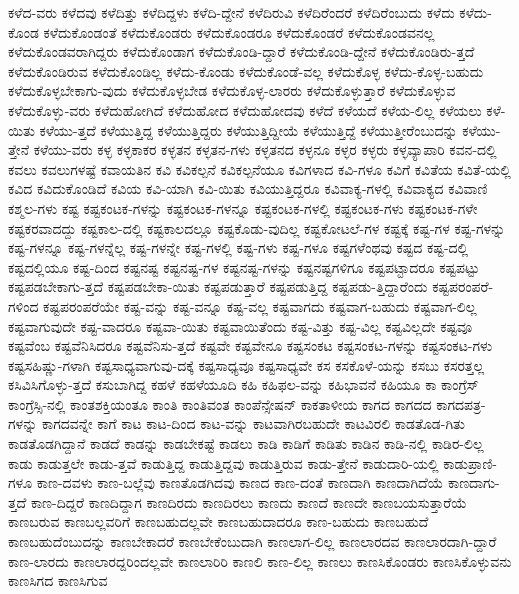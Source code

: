 {ಕಳೆದ-ವರು
ಕಳೆದವು
ಕಳೆದಿತ್ತು
ಕಳೆದಿದ್ದಳು
ಕಳೆದಿ-ದ್ದೇನೆ
ಕಳೆದಿರುವಿ
ಕಳೆದಿರೆಂದರೆ
ಕಳೆದಿರೆಂಬುದು
ಕಳೆದು
ಕಳೆದು-ಕೊಂಡ
ಕಳೆದುಕೊಂಡಂತೆ
ಕಳೆದುಕೊಂಡರು
ಕಳೆದುಕೊಂಡರೂ
ಕಳೆದುಕೊಂಡರೆ
ಕಳೆದುಕೊಂಡವನಲ್ಲ
ಕಳೆದುಕೊಂಡವರಾಗಿದ್ದರು
ಕಳೆದುಕೊಂಡಾಗ
ಕಳೆದುಕೊಂಡಿ-ದ್ದಾರೆ
ಕಳೆದುಕೊಂಡಿ-ದ್ದೇನೆ
ಕಳೆದುಕೊಂಡಿರು-ತ್ತದೆ
ಕಳೆದುಕೊಂಡಿರುವ
ಕಳೆದುಕೊಂಡಿಲ್ಲ
ಕಳೆದು-ಕೊಂಡು
ಕಳೆದುಕೊಂಡೆ-ವಲ್ಲ
ಕಳೆದುಕೊಳ್ಳ
ಕಳೆದು-ಕೊಳ್ಳ-ಬಹುದು
ಕಳೆದುಕೊಳ್ಳಬೇಕಾಗು-ವುದು
ಕಳೆದುಕೊಳ್ಳಬೇಡ
ಕಳೆದುಕೊಳ್ಳ-ಲಾರರು
ಕಳೆದುಕೊಳ್ಳುತ್ತಾರೆ
ಕಳೆದುಕೊಳ್ಳುವ
ಕಳೆದುಕೊಳ್ಳು-ವರು
ಕಳೆದುಹೋಗಿದೆ
ಕಳೆದುಹೋದ
ಕಳೆದುಹೋದವು
ಕಳೆದೆ
ಕಳೆಯದೆ
ಕಳೆಯ-ಲಿಲ್ಲ
ಕಳೆಯಲು
ಕಳೆ-ಯಿತು
ಕಳೆಯು-ತ್ತದೆ
ಕಳೆಯುತ್ತಿದ್ದ
ಕಳೆಯುತ್ತಿದ್ದರು
ಕಳೆಯುತ್ತಿದ್ದೀಯೆ
ಕಳೆಯುತ್ತಿದ್ದೆ
ಕಳೆಯುತ್ತೀರೆಂಬುದನ್ನು
ಕಳೆಯು-ತ್ತೇನೆ
ಕಳೆಯು-ವರು
ಕಳ್ಳ
ಕಳ್ಳಕಾಕರ
ಕಳ್ಳತನ
ಕಳ್ಳತನ-ಗಳು
ಕಳ್ಳತನದ
ಕಳ್ಳನೂ
ಕಳ್ಳರ
ಕಳ್ಳರು
ಕಳ್ಳವ್ಯಾಪಾರಿ
ಕವನ-ದಲ್ಲಿ
ಕವಲು
ಕವಲುಗಳಷ್ಟೆ
ಕವಾಯತಿನ
ಕವಿ
ಕವಿಕಲ್ಪನೆ
ಕವಿಕಲ್ಪನೆಯೂ
ಕವಿಗಳಾದ
ಕವಿ-ಗಳೂ
ಕವಿಗೆ
ಕವಿತೆಯ
ಕವಿತೆ-ಯಲ್ಲಿ
ಕವಿದ
ಕವಿದುಕೊಂಡಿದೆ
ಕವಿಯ
ಕವಿ-ಯಾಗಿ
ಕವಿ-ಯಿತು
ಕವಿಯುತ್ತಿದ್ದರೂ
ಕವಿವಾಕ್ಯ-ಗಳಲ್ಲಿ
ಕವಿವಾಕ್ಯದ
ಕವಿವಾಣಿ
ಕಶ್ಮಲ-ಗಳು
ಕಷ್ಟ
ಕಷ್ಟಕಂಟಕ-ಗಳನ್ನು
ಕಷ್ಟಕಂಟಕ-ಗಳನ್ನೂ
ಕಷ್ಟಕಂಟಕ-ಗಳಲ್ಲಿ
ಕಷ್ಟಕಂಟಕ-ಗಳು
ಕಷ್ಟಕಂಟಕ-ಗಳೇ
ಕಷ್ಟಕರವಾದದ್ದು
ಕಷ್ಟಕಾಲ-ದಲ್ಲಿ
ಕಷ್ಟಕಾಲದಲ್ಲೂ
ಕಷ್ಟಕೊಡು-ವುದಿಲ್ಲ
ಕಷ್ಟಕೋಟಲೆ-ಗಳ
ಕಷ್ಟಕ್ಕೆ
ಕಷ್ಟ-ಗಳ
ಕಷ್ಟ-ಗಳನ್ನು
ಕಷ್ಟ-ಗಳನ್ನೂ
ಕಷ್ಟ-ಗಳನ್ನೆಲ್ಲ
ಕಷ್ಟ-ಗಳನ್ನೇ
ಕಷ್ಟ-ಗಳಲ್ಲಿ
ಕಷ್ಟ-ಗಳು
ಕಷ್ಟ-ಗಳೂ
ಕಷ್ಟಗಳೆಂಥವು
ಕಷ್ಟದ
ಕಷ್ಟ-ದಲ್ಲಿ
ಕಷ್ಟದಲ್ಲಿಯೂ
ಕಷ್ಟ-ದಿಂದ
ಕಷ್ಟನಷ್ಟ
ಕಷ್ಟನಷ್ಟ-ಗಳ
ಕಷ್ಟನಷ್ಟ-ಗಳನ್ನು
ಕಷ್ಟನಷ್ಟಗಳಿಗೂ
ಕಷ್ಟಪಟ್ಟಾದರೂ
ಕಷ್ಟಪಟ್ಟು
ಕಷ್ಟಪಡಬೇಕಾಗು-ತ್ತದೆ
ಕಷ್ಟಪಡಬೇಕಾ-ಯಿತು
ಕಷ್ಟಪಡುತ್ತಾರೆ
ಕಷ್ಟಪಡುತ್ತಿದ್ದ
ಕಷ್ಟಪಡು-ತ್ತಿದ್ದಾರೆಂದು
ಕಷ್ಟಪರಂಪರೆ-ಗಳಿಂದ
ಕಷ್ಟಪರಂಪರೆಯೇ
ಕಷ್ಟ-ವನ್ನು
ಕಷ್ಟ-ವನ್ನೂ
ಕಷ್ಟ-ವಲ್ಲ
ಕಷ್ಟವಾಗದು
ಕಷ್ಟವಾಗ-ಬಹುದು
ಕಷ್ಟವಾಗ-ಲಿಲ್ಲ
ಕಷ್ಟವಾಗುವುದೇ
ಕಷ್ಟ-ವಾದರೂ
ಕಷ್ಟವಾ-ಯಿತು
ಕಷ್ಟವಾಯಿತೆಂದು
ಕಷ್ಟ-ವಿತ್ತು
ಕಷ್ಟ-ವಿಲ್ಲ
ಕಷ್ಟವಿಲ್ಲದೇ
ಕಷ್ಟವೂ
ಕಷ್ಟವೆಂಬ
ಕಷ್ಟವೆನಿಸಿದರೂ
ಕಷ್ಟವೆನಿಸು-ತ್ತದೆ
ಕಷ್ಟವೇ
ಕಷ್ಟವೇನೂ
ಕಷ್ಟಸಂಕಟ
ಕಷ್ಟಸಂಕಟ-ಗಳನ್ನು
ಕಷ್ಟಸಂಕಟ-ಗಳು
ಕಷ್ಟಸಹಿಷ್ಣು-ಗಳಾಗಿ
ಕಷ್ಟಸಾಧ್ಯವಾಗುವು-ದಕ್ಕೆ
ಕಷ್ಟಸಾಧ್ಯವೂ
ಕಷ್ಟಸಾಧ್ಯವೇ
ಕಸ
ಕಸಕೊಳೆ-ಯನ್ನು
ಕಸಬು
ಕಸರತ್ತಲ್ಲ
ಕಸಿವಿಸಿಗೊಳ್ಳು-ತ್ತದೆ
ಕಸುಬಾಗಿದ್ದ
ಕಹಳೆ
ಕಹಳೆಯೂದಿ
ಕಹಿ
ಕಹಿಫಲ-ವನ್ನು
ಕಹಿಭಾವನೆ
ಕಹಿಯೂ
ಕಾ
ಕಾಂಗ್ರೆಸ್
ಕಾಂಗ್ರೆಸ್ಸಿ-ನಲ್ಲಿ
ಕಾಂತಶಕ್ತಿಯಂತೂ
ಕಾಂತಿ
ಕಾಂತಿವಂತ
ಕಾಂಪೆನ್ಸೇಷನ್
ಕಾಕತಾಳೀಯ
ಕಾಗದ
ಕಾಗದದ
ಕಾಗದಪತ್ರ-ಗಳನ್ನು
ಕಾಗದವನ್ನೇ
ಕಾಗೆ
ಕಾಟ
ಕಾಟ-ದಿಂದ
ಕಾಟ-ವನ್ನು
ಕಾಟವಾಗಿರಬಹುದೇ
ಕಾಟವಿರಲಿ
ಕಾಡತೊಡ-ಗಿತು
ಕಾಡತೊಡಗಿದ್ದಾನೆ
ಕಾಡದೆ
ಕಾಡನ್ನು
ಕಾಡಬೇಕಷ್ಟೆ
ಕಾಡಲು
ಕಾಡಿ
ಕಾಡಿಗೆ
ಕಾಡಿತು
ಕಾಡಿನ
ಕಾಡಿ-ನಲ್ಲಿ
ಕಾಡಿರ-ಲಿಲ್ಲ
ಕಾಡು
ಕಾಡುತ್ತಲೇ
ಕಾಡು-ತ್ತವೆ
ಕಾಡುತ್ತಿದ್ದ
ಕಾಡುತ್ತಿದ್ದವು
ಕಾಡುತ್ತಿರುವ
ಕಾಡು-ತ್ತೇನೆ
ಕಾಡುದಾರಿ-ಯಲ್ಲಿ
ಕಾಡುಪ್ರಾಣಿ-ಗಳೂ
ಕಾಣ-ದವಳು
ಕಾಣ-ಬಲ್ಲೆವು
ಕಾಣತೊಡಗಿದವು
ಕಾಣದ
ಕಾಣ-ದಂತೆ
ಕಾಣದಾಗಿ
ಕಾಣದಾಗಿದೆಯೆ
ಕಾಣದಾಗು-ತ್ತದೆ
ಕಾಣ-ದಿದ್ದರೆ
ಕಾಣದಿದ್ದಾಗ
ಕಾಣದಿರದು
ಕಾಣದಿರಲು
ಕಾಣದು
ಕಾಣದೆ
ಕಾಣದೇ
ಕಾಣಬಯಸುತ್ತಾರೆಯೆ
ಕಾಣಬರುವ
ಕಾಣಬಲ್ಲವರಿಗೆ
ಕಾಣಬಹುದಲ್ಲವೇ
ಕಾಣಬಹುದಾದರೂ
ಕಾಣ-ಬಹುದು
ಕಾಣಬಹುದೆ
ಕಾಣಬಹುದೆಂಬುದನ್ನು
ಕಾಣಬೇಕಾದರೆ
ಕಾಣಬೇಕೆಂಬುದಾಗಿ
ಕಾಣಲಾಗ-ಲಿಲ್ಲ
ಕಾಣಲಾರದವ
ಕಾಣಲಾರದಾಗಿ-ದ್ದಾರೆ
ಕಾಣ-ಲಾರದು
ಕಾಣಲಾರದ್ದರಿಂದಲ್ಲವೇ
ಕಾಣಲಾರಿರಿ
ಕಾಣಲಿ
ಕಾಣ-ಲಿಲ್ಲ
ಕಾಣಲು
ಕಾಣಸಿಕೊಂಡರು
ಕಾಣಸಿಕೊಳ್ಳುವನು
ಕಾಣಸಿಗದ
ಕಾಣಸಿಗುವ
}
